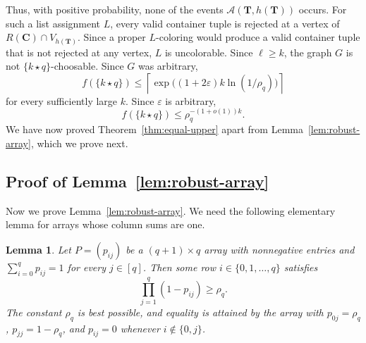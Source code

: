\documentclass[12pt]{article}
\numberwithin{equation}{section}
\newtheorem{lemma}[theorem]{Lemma}
\theoremstyle{definition}
\newcommand{\equalparts}[2]{\{#1\star #2\}}
\begin{document}
Thus, with positive probability, none of the events
$\mathcal A(\mathbf T,h(\mathbf T))$ occurs. For such a list assignment $L$,
every valid container tuple is rejected at a vertex of
$R(\mathbf C)\cap V_{h(\mathbf T)}$. Since a proper $L$-coloring would produce
a valid container tuple that is not rejected at any vertex, $L$ is
uncolorable.
Since $\ell\geq k$, the graph $G$ is not $\equalparts{k}{q}$-choosable.
Since $G$ was arbitrary,
\[
 f(\equalparts{k}{q})
 \leq\left\lceil\exp\bigl((1+2\varepsilon)k\ln(1/\rho_q)\bigr)\right\rceil
\]
for every sufficiently large $k$.
Since $\varepsilon$ is arbitrary,
\[
 f(\equalparts{k}{q})\leq\rho_q^{-(1+o(1))k}.
\]
We have now proved Theorem~\ref{thm:equal-upper} apart from
Lemma~\ref{lem:robust-array}, which we prove next.

\subsection{Proof of Lemma~\ref{lem:robust-array}}\label{subsec:array-proof}

Now we prove Lemma~\ref{lem:robust-array}. We need the following elementary
lemma for arrays whose column sums are one.

\begin{lemma}\label{lem:exact-array}
Let $P = (p_{ij})$ be a $(q + 1)\times q$ array with nonnegative entries and
$\sum_{i = 0}^q p_{ij} = 1$ for every $j \in [q]$. Then some row
$i \in \{0,1,\ldots,q\}$ satisfies
\begin{equation}\label{eq:allocation}
        \prod_{j = 1}^q(1 - p_{ij}) \geq \rho_q.
\end{equation}
The constant $\rho_q$ is best possible, and equality is attained by the array
with $p_{0j} = \rho_q$, $p_{jj} = 1 - \rho_q$, and $p_{ij} = 0$ whenever
$i \notin \{0,j\}$.
\end{lemma}
\end{document}
